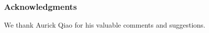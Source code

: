 \ificlrfinal
\subsubsection*{Acknowledgments}
\label{sec:acknowledgements}

We thank Aurick Qiao for his valuable comments and suggestions.
\fi
